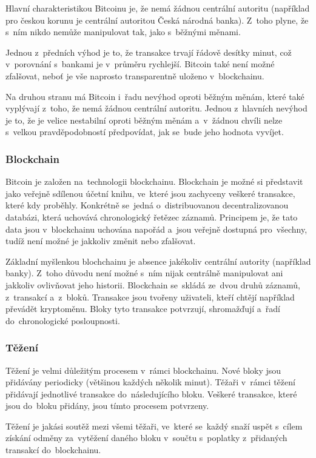 \documentclass[thesis=B,czech]{FITthesis}[2019/03/21]
\begin{document}
Hlavní charakteristikou Bitcoinu je, že nemá žádnou centrální autoritu (například pro českou korunu je centrální autoritou Česká národná banka). Z~toho plyne, že s~ním nikdo nemůže manipulovat tak, jako s~běžnými měnami.

Jednou z~předních výhod je to, že transakce trvají řádově desítky minut, což v~porovnání s~bankami je v~průměru rychlejší. Bitcoin také není možné zfalšovat, neboť je vše naprosto transparentně uloženo v~blockchainu.

Na druhou stranu má Bitcoin i~řadu nevýhod oproti běžným měnám, které také vyplývají z~toho, že nemá žádnou centrální autoritu. Jednou z~hlavních nevýhod je to, že je velice nestabilní oproti běžným měnám a~v~žádnou chvíli nelze s~velkou pravděpodobností předpovídat, jak se~bude jeho hodnota vyvíjet. \cite{Finex}

\subsubsection{Blockchain}
Bitcoin je založen na~technologii blockchainu. Blockchain je možné si představit jako veřejně sdílenou účetní knihu, ve~které jsou zachyceny veškeré transakce, které kdy proběhly. Konkrétně se~jedná o~distribuovanou decentralizovanou databázi, která uchovává chronologický řetězec záznamů. Principem je, že tato data jsou v~blockchainu uchována napořád a~jsou veřejně dostupná pro~všechny, tudíž není možné je jakkoliv změnit nebo zfalšovat. \cite{Bitcoin_how_it_works}

Základní myšlenkou blochchainu je absence jakékoliv centrální autority (například banky). Z~toho důvodu není možné s~ním nijak centrálně manipulovat ani jakkoliv ovlivňovat jeho historii.
Blockchain se~skládá ze~dvou druhů záznamů, z~transakcí a~z~bloků. Transakce jsou tvořeny uživateli, kteří chtějí například převádět kryptoměnu. Bloky tyto transakce potvrzují, shromažďují a~řadí do~chronologické posloupnosti. \cite{Finex_blockchain}

\subsubsection{Těžení}
Těžení je velmi důležitým procesem v~rámci blockchainu. Nové bloky jsou přidávány periodicky (většinou každých několik minut). Těžaři v~rámci těžení přidávají jednotlivé transakce do~následujícího bloku. Veškeré transakce, které jsou do~bloku přidány, jsou tímto procesem potvrzeny. 

Těžení je jakási soutěž mezi všemi těžaři, ve~které se~každý snaží uspět s~cílem získání odměny za~vytěžení daného bloku v~součtu s~poplatky z~přidaných transakcí do~blockchainu.
\end{document}
